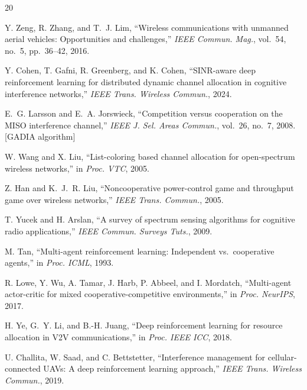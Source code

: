 \documentclass[journal]{IEEEtran}
\begin{document}
\begin{thebibliography}{20}

Y. Zeng, R. Zhang, and T.~J. Lim, ``Wireless communications with unmanned aerial vehicles: Opportunities and challenges,'' \emph{IEEE Commun. Mag.}, vol.~54, no.~5, pp.~36--42, 2016.

Y. Cohen, T. Gafni, R. Greenberg, and K. Cohen, ``SINR-aware deep reinforcement learning for distributed dynamic channel allocation in cognitive interference networks,'' \emph{IEEE Trans. Wireless Commun.}, 2024.

E.~G. Larsson and E.~A. Jorswieck, ``Competition versus cooperation on the MISO interference channel,'' \emph{IEEE J. Sel. Areas Commun.}, vol.~26, no.~7, 2008. [GADIA algorithm]

W. Wang and X. Liu, ``List-coloring based channel allocation for open-spectrum wireless networks,'' in \emph{Proc. VTC}, 2005.

Z. Han and K.~J.~R. Liu, ``Noncooperative power-control game and throughput game over wireless networks,'' \emph{IEEE Trans. Commun.}, 2005.

T. Yucek and H. Arslan, ``A survey of spectrum sensing algorithms for cognitive radio applications,'' \emph{IEEE Commun. Surveys Tuts.}, 2009.

M. Tan, ``Multi-agent reinforcement learning: Independent vs.\ cooperative agents,'' in \emph{Proc. ICML}, 1993.

R. Lowe, Y. Wu, A. Tamar, J. Harb, P. Abbeel, and I. Mordatch, ``Multi-agent actor-critic for mixed cooperative-competitive environments,'' in \emph{Proc. NeurIPS}, 2017.

H. Ye, G.~Y. Li, and B.-H. Juang, ``Deep reinforcement learning for resource allocation in V2V communications,'' in \emph{Proc. IEEE ICC}, 2018.

U. Challita, W. Saad, and C. Bettstetter, ``Interference management for cellular-connected UAVs: A deep reinforcement learning approach,'' \emph{IEEE Trans. Wireless Commun.}, 2019.

\end{thebibliography}
\end{document}
